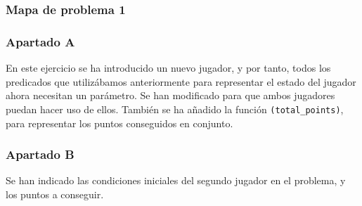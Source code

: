 \documentclass[11pt,a4paper]{article}
\begin{document}
\subsubsection{Mapa de problema 1}

\subsubsection{Apartado A}
En este ejercicio se ha introducido un nuevo jugador, y por tanto, todos los predicados que utilizábamos anteriormente para representar el estado del jugador ahora necesitan un parámetro. Se han modificado para que ambos jugadores puedan hacer uso de ellos. También se ha
añadido la función \texttt{(total\_points)}, para representar los puntos conseguidos en conjunto.

\subsubsection{Apartado B}
Se han indicado las condiciones iniciales del segundo jugador en el problema, y los puntos a conseguir.
\end{document}
